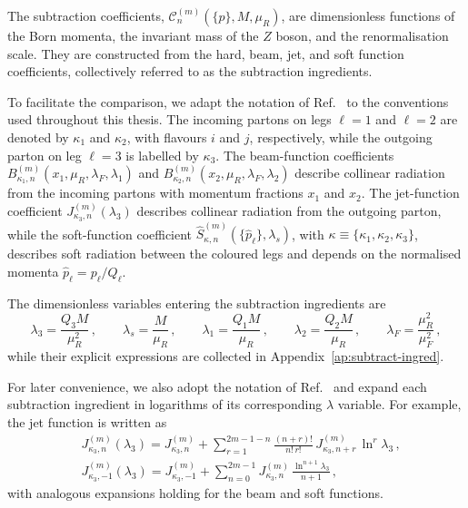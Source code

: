 The subtraction coefficients,
$\mathcal{C}_n^{(m)}(\{p\},M,\mu_R)$, are dimensionless functions of the
Born momenta, the invariant mass of the $Z$ boson, and the
renormalisation scale. They are constructed from the hard, beam, jet,
and soft function coefficients, collectively referred to as the subtraction
ingredients.

To facilitate the comparison, we adapt the notation of
Ref.~\cite{Gaunt:2015pea} to the conventions used throughout this
thesis. The incoming partons on legs $\ell=1$ and $\ell=2$ are denoted
by $\kappa_1$ and $\kappa_2$, with flavours $i$ and $j$,
respectively, while the outgoing parton on leg $\ell=3$ is labelled by
$\kappa_3$. The beam-function coefficients
$B_{\kappa_1,n}^{(m)}(x_1,\mu_R,\lambda_F,\lambda_1)$ and
$B_{\kappa_2,n}^{(m)}(x_2,\mu_R,\lambda_F,\lambda_2)$ describe
collinear radiation from the incoming partons with momentum fractions
$x_1$ and $x_2$. The jet-function coefficient
$J_{\kappa_3,n}^{(m)}(\lambda_3)$ describes collinear radiation from the
outgoing parton, while the soft-function coefficient
$\widehat{S}_{\kappa,n}^{(m)}(\{\hat{p}_\ell\},\lambda_s)$, with
$\kappa\equiv\{\kappa_1,\kappa_2,\kappa_3\}$, describes soft radiation
between the coloured legs and depends on the normalised momenta
$\hat{p}_\ell=p_\ell/Q_\ell$. 

The dimensionless variables entering the subtraction ingredients are
\begin{equation}
    \lambda_3 = \frac{Q_3 M}{\mu_R^2}\,, \qquad
    \lambda_s = \frac{M}{\mu_R}\,, \qquad
    \lambda_1 = \frac{Q_1 M}{\mu_R}\,, \qquad
    \lambda_2 = \frac{Q_2 M}{\mu_R}\,, \qquad
    \lambda_F = \frac{\mu_R^2}{\mu_F^2}\,,
\end{equation}
while their explicit expressions are collected in
Appendix~\ref{ap:subtract-ingred}.

For later convenience, we also adopt the notation of
Ref.~\cite{Gaunt:2015pea} and expand each subtraction ingredient in
logarithms of its corresponding $\lambda$ variable. For example, the
jet function is written as
\begin{subequations}
\label{eq:subt-mn-exp}
\begin{align}
    &J_{\kappa_3,n}^{(m)}(\lambda_3) = J_{\kappa_3,n}^{(m)}
    + \sum_{r=1}^{2m-1-n}\frac{(n+r)!}{n!\,r!}\,J_{\kappa_3,n+r}^{(m)}\,\ln^r\!\lambda_3\,, \\
    &J_{\kappa_3,-1}^{(m)}(\lambda_3) =J_{\kappa_3,-1}^{(m)}+\sum_{n=0}^{2m-1}J_{\kappa_3,n}^{(m)}\,\frac{\ln^{n+1}\!\lambda_3}{n+1}\,, 
\end{align}
\end{subequations}
with analogous expansions holding for the beam and soft functions.

